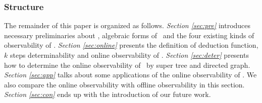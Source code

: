 \subsubsection*{Structure}
The remainder of this paper is organized as follows. {\em Section \ref{sec:pre}} introduces necessary preliminaries about \BCNs, algebraic forms of \BCNs\ and the four existing kinds of observability of  \BCNs. {\em Section \ref{sec:online}} presents the definition of deduction function, $k$ steps determinability and online observability of \BCNs. {\em Section \ref{sec:deter}} presents how to determine the online observability of \BCNs\ by super tree and directed graph. {\em Section \ref{sec:app}} talks about some applications of the online observability of \BCNs. We also compare the online observability with offline observability in this section. {\em Section \ref{sec:con}} ends up  with the introduction of our future work.


